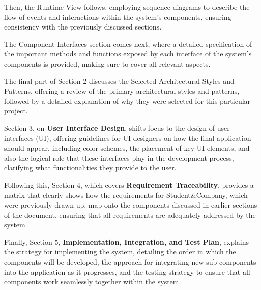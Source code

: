 Then, the Runtime View follows,
employing sequence diagrams to describe the flow of events and interactions within the system’s
components, ensuring consistency with the previously discussed sections.

The Component Interfaces
section comes next, where a detailed specification of the important methods and functions exposed
by each interface of the system’s components is provided, making sure to cover all relevant aspects.

The final part of Section 2 discusses the Selected Architectural Styles and Patterns, offering a
review of the primary architectural styles and patterns, followed by a detailed explanation of why
they were selected for this particular project.

Section 3, on \textbf{User Interface Design}, shifts focus to the design of user interfaces (UI), offering
guidelines for UI designers on how the final application should appear, including color schemes,
the placement of key UI elements, and also the logical role that these interfaces play in the
development process, clarifying what functionalities they provide to the user.

Following this,
Section 4, which covers \textbf{Requirement Traceability}, provides a matrix that clearly shows how the
requirements for Student\&Company, which were previously drawn up, map onto the components discussed
in earlier sections of the document, ensuring that all requirements are adequately addressed by the
system.

Finally, Section 5, \textbf{Implementation, Integration, and Test Plan}, explains the strategy for
implementing the system, detailing the order in which the components will be developed, the
approach for integrating new sub-components into the application as it progresses, and the
testing strategy to ensure that all components work seamlessly together within the system.